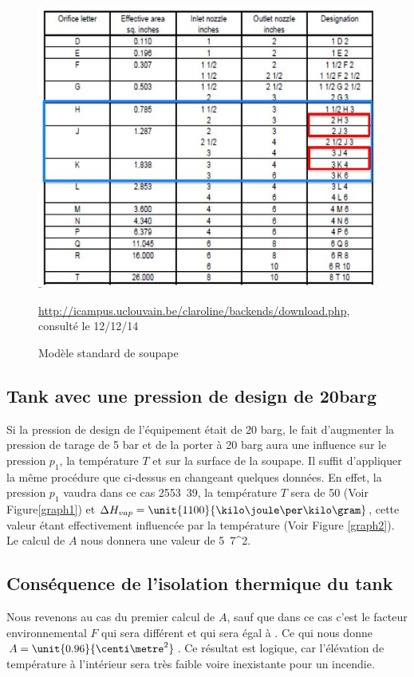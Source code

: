\begin{figure}[ht!]
\centering
\includegraphics[scale=0.4]{tab.jpg}
\caption{Modèle standard de soupape}
\small \url{http://icampus.uclouvain.be/claroline/backends/download.php}, consulté le 12/12/14
\label{tab}
\end{figure}

\subsection{Tank avec une pression de design de \unit{20}{barg}}
Si la pression de design de l’équipement était de 20 barg, le fait d’augmenter la pression de tarage de 5 bar et de la porter à 20 barg aura une influence sur le pression $p_1$, la température $T$ et sur la surface de la soupape.
Il suffit d'appliquer la même procédure que ci-dessus en changeant quelques données. En effet, la pression $p_1$ vaudra dans ce cas \unit{2553.39}{\kilo \pascal}, la température $T$ sera de \unit{50}{\celsius} (Voir Figure\ref{graph1}) et $\Delta H_{vap}=\unit{1100}{\kilo \joule \per \kilo \gram}$, cette valeur étant effectivement influencée par la température (Voir Figure \ref{graph2}). Le calcul de $A$ nous donnera une valeur de \unit{5.7}{\centi \metre^2}.

\subsection{Conséquence de l'isolation thermique du tank}

Nous revenons au cas du premier calcul de $A$, sauf que dans ce cas c'est le facteur environnemental $F$ qui sera différent et qui sera égal à . Ce qui nous donne $A=\unit{0.96}{\centi \metre^2}$. Ce résultat est logique, car l'élévation de température à l'intérieur sera très faible voire inexistante pour un incendie.

